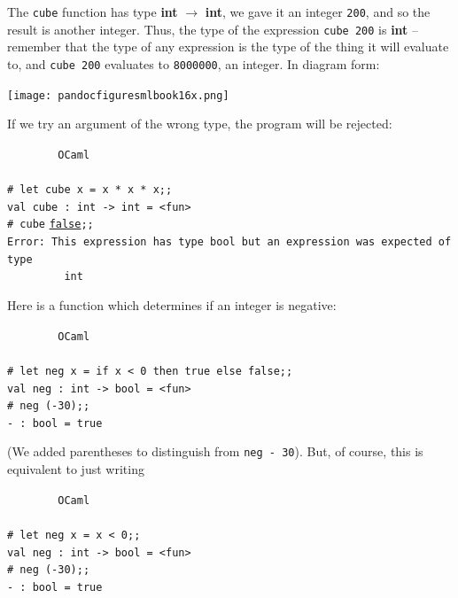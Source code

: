 \documentclass[]{book}
\newcommand{\smspace}{\vspace{4mm}}
\begin{document}
The \texttt{cube} function has type \textsf{\textbf{int} $\rightarrow$ \textbf{int}}, we gave it an integer \texttt{200}, and so the result is another integer. Thus, the type of the expression \texttt{cube 200} is \textbf{\textsf{int}} -- remember that the type of any expression is the type of the thing it will evaluate to, and \texttt{cube 200} evaluates to \texttt{8000000}, an integer. In diagram form:

\medskip
\begin{center}
\noindent\texttt{[image: pandocfiguresmlbook16x.png]}
\end{center}
\medskip

\noindent If we try an argument of the wrong type, the program will be rejected:

\smspace
\noindent\verb!        OCaml!\\
\noindent\\
\noindent\verb!# let cube x = x * x * x;;!\\
\noindent\verb!val cube : int -> int = <fun>!\\
\noindent\texttt{\# cube} \underline{\verb!false!}\texttt{;;}\\
\noindent\verb!Error: This expression has type bool but an expression was expected of type!\\
\noindent\verb!         int!
\smspace

\noindent Here is a function which determines if an integer is negative:

\smspace
\noindent\verb!        OCaml!\\
\noindent\\
\noindent\verb!# let neg x = if x < 0 then true else false;;!\\
\noindent\verb!val neg : int -> bool = <fun>!\\
\noindent\texttt{\# neg (-30);;}\\
\noindent\verb!- : bool = true!
\smspace

\noindent (We added parentheses to distinguish from \texttt{neg - 30}). But, of course, this is equivalent to just writing

\smspace
\noindent\verb!        OCaml!\\
\noindent\\
\noindent\verb!# let neg x = x < 0;;!\\
\noindent\verb!val neg : int -> bool = <fun>!\\
\noindent\texttt{\# neg (-30);;}\\
\noindent\verb!- : bool = true!
\smspace
\end{document}
